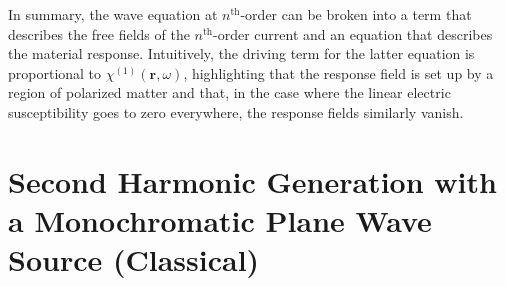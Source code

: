 \documentclass{article}
\begin{document}
In summary, the wave equation at $n^\mathrm{th}$-order can be broken into a term that describes the free fields of the $n^\mathrm{th}$-order current and an equation that describes the material response. Intuitively, the driving term for the latter equation is proportional to $\chi^{(1)}(\mathbf{r},\omega)$, highlighting that the response field is set up by a region of polarized matter and that, in the case where the linear electric susceptibility goes to zero everywhere, the response fields similarly vanish. 









\newpage
\section{Second Harmonic Generation with a Monochromatic Plane Wave Source (Classical)}\label{sec:SHGclassical}
\end{document}
